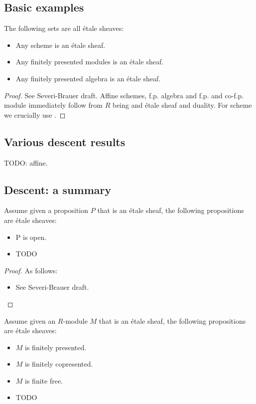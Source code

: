 
\subsection{Basic examples}

\begin{proposition}
The following sets are all \'etale sheaves: 
\begin{itemize}
\item Any scheme is an \'etale sheaf.
\item Any finitely presented modules is an \'etale sheaf.
\item Any finitely presented algebra is an \'etale sheaf.
\end{itemize}
\end{proposition}

\begin{proof}
See Severi-Brauer draft. Affine schemes, f.p. algebra and f.p. and co-f.p. module immediately follow from $R$ being and \'etale sheaf and duality. For scheme we crucially use . 
\end{proof}


\subsection{Various descent results}

TODO: affine.


\subsection{Descent: a summary}

\begin{proposition}
Assume given a proposition $P$ that is an \'etale sheaf, the following propositions are \'etale sheaves:
\begin{itemize}[(i)]
\item P is open.
\item TODO
\end{itemize}
\end{proposition}

\begin{proof}
As follows:
\begin{itemize}
\item[Open] See Severi-Brauer draft.
\end{itemize}
\end{proof}

\begin{proposition}
Assume given an $R$-module $M$ that is an \'etale sheaf, the following propositions are \'etale sheaves:
\begin{itemize}[(i)]
\item $M$ is finitely presented.
\item $M$ is finitely copresented.
\item $M$ is finite free.
\item TODO
\end{itemize}
\end{proposition}

